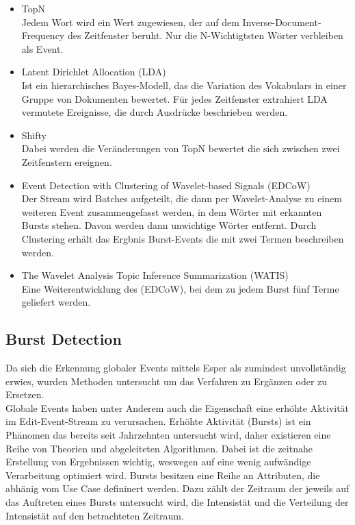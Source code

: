 \begin{itemize}
\item TopN\\Jedem Wort wird ein Wert zugewiesen, der auf dem Inverse-Document-Frequency des Zeitfenster beruht. Nur die N-Wichtigtsten Wörter verbleiben als Event.
\item Latent Dirichlet Allocation (LDA)\\Ist ein hierarchisches Bayes-Modell, das die Variation des Vokabulars in einer Gruppe von Dokumenten bewertet. Für jedes Zeitfenster extrahiert LDA  vermutete Ereignisse, die durch Ausdrücke beschrieben werden. 
\item Shifty\\Dabei werden die Veränderungen von TopN bewertet die sich zwischen zwei Zeitfenstern ereignen.
\item Event Detection with Clustering of
Wavelet-based Signals (EDCoW)\\Der Stream wird Batches aufgeteilt, die dann per Wavelet-Analyse zu einem weiteren Event zusammengefasst werden, in dem Wörter mit erkannten Bursts stehen. Davon werden dann unwichtige Wörter entfernt. Durch Clustering erhält das Ergbnis Burst-Events die mit zwei Termen beschreiben werden.
\item The Wavelet Analysis Topic Inference Summarization
(WATIS)\\ Eine Weiterentwicklung des (EDCoW), bei dem zu jedem Burst fünf Terme geliefert werden.
\end{itemize}

\subsection{Burst Detection}
Da sich die Erkennung globaler Events mittels Esper als zumindest unvollständig erwies, wurden Methoden untersucht um das Verfahren zu Ergänzen oder zu Ersetzen.\\

Globale Events haben unter Anderem auch die Eigenschaft eine erhöhte Aktivität im Edit-Event-Stream zu verursachen. Erhöhte Aktivität (Bursts) ist ein Phänomen das bereits seit Jahrzehnten untersucht wird, daher existieren eine Reihe von Theorien und abgeleiteten Algorithmen. Dabei ist die zeitnahe Erstellung von Ergebnissen wichtig, weswegen auf eine wenig aufwändige Verarbeitung optimiert wird. Bursts besitzen eine Reihe an Attributen, die abhänig vom Use Case defininert werden. Dazu zählt der Zeitraum der jeweils auf das Auftreten eines Bursts untersucht wird, die Intensistät und die Verteilung der Intensistät auf den betrachteten Zeitraum.


